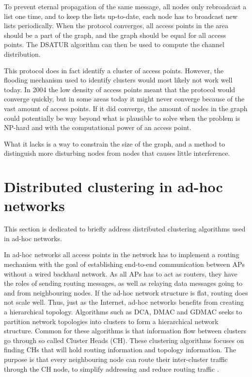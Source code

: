 To prevent eternal propagation of the same message, all nodes only rebroadcast a list one time, and to keep the lists up-to-date, each node has to broadcast new
lists periodically. When the protocol converges, all access points in the area should be a part of the graph, and the graph should be equal for all access points. The DSATUR algorithm can then be used to compute the channel distribution.

This protocol does in fact identify a cluster of access points. However, the flooding mechanism used to identify clusters
would most likely not work well today. In 2004 the low density of access points meant that the protocol would converge quickly, but in some areas today it might never converge because
of the vast amount of access points. If it did converge, the amount of nodes in the graph could potentially be way beyond what is plausible to solve when the problem is NP-hard and with the computational power of an access point. 

What it lacks is a way to constrain the size of the graph, and a method to distinguish more disturbing nodes from nodes that causes little interference.

%
\section{Distributed clustering in ad-hoc networks}
This section is dedicated to briefly address distributed clustering algorithms used in ad-hoc networks.

In ad-hoc networks all access points in the network has to implement a routing mechanism with the goal of establishing end-to-end communication 
between APs without a wired backhaul network. As all APs has to act as routers, they have the roles of sending routing messages, as well as relaying data messages
going to and from neighbouring nodes. If the ad-hoc network structure is flat, routing does not scale well. Thus, just as the Internet, ad-hoc networks benefits
from creating a hierarchical topology. Algorithms such as DCA, DMAC  and GDMAC \cite{Basagni} seeks to partition network topologies into clusters to form a hierarchical network structure.
Common for these algorithms is that information flow between clusters go through so called Cluster Heads (CH). These clustering algorithms focuses on finding CHs that will hold routing information and topology information. The purpose is that every neighbouring node can route their inter-cluster traffic through the CH node, to simplify addressing and reduce routing traffic \cite{Mamalis}.

